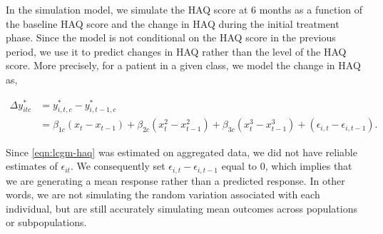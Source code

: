 \documentclass[11pt,final,fleqn]{article}
\theoremstyle{plain}
\begin{document}
\begin{appendices}
In the simulation model, we simulate the HAQ score at 6 months as a function of the baseline HAQ score and the change in HAQ during the initial treatment phase. Since the \citet{norton2014health} model is not conditional on the HAQ score in the previous period, we use it to predict changes in HAQ rather than the level of the HAQ score. More precisely, for a patient in a given class, we model the change in HAQ as,  

\begin{align}\label{eqn:lcgm-dhaq}
\Delta y_{itc}^{*} &= y_{i,t,c}^{*} - y_{i,t-1,c}^{*} \\
&= \beta_{1c}(x_t - x_{t-1}) + \beta_{2c}(x_t^2 - x_{t-1}^2) + \beta_{3c}(x_t^3-x_{t-1}^3) + (\epsilon_{i,t} - \epsilon_{i,t-1}). \nonumber
\end{align}

Since \autoref{eqn:lcgm-haq} was estimated on aggregated data, we did not have reliable estimates of $\epsilon_{it}$. We consequently set $\epsilon_{i,t} - \epsilon_{i,t-1}$ equal to 0, which implies that we are generating a mean response rather than a predicted response. In other words, we are not simulating the random variation associated with each individual, but are still accurately simulating mean outcomes across populations or subpopulations. 


\end{appendices}
\end{document}
